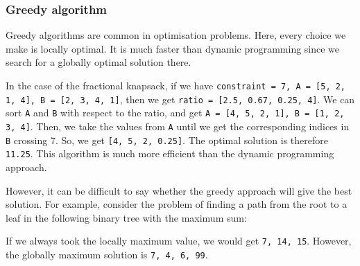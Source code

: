 \documentclass[a4paper, openany]{memoir}
\begin{document}
\subsubsection{Greedy algorithm}
Greedy algorithms are common in optimisation problems. Here, every choice we make is locally optimal. It is much faster than dynamic programming since we search for a globally optimal solution there. 

\noindent In the case of the fractional knapsack, if we have \texttt{constraint = 7, A = [5, 2, 1, 4], B = [2, 3, 4, 1]}, then we get \texttt{ratio = [2.5, 0.67, 0.25, 4]}. We can sort \texttt{A} and \texttt{B} with respect to the ratio, and get \texttt{A = [4, 5, 2, 1], B = [1, 2, 3, 4]}. Then, we take the values from \texttt{A} until we get the corresponding indices in \texttt{B} crossing 7. So, we get \texttt{[4, 5, 2, 0.25]}. The optimal solution is therefore \texttt{11.25}. This algorithm is much more efficient than the dynamic programming approach.

\noindent However, it can be difficult to say whether the greedy approach will give the best solution. For example, consider the problem of finding a path from the root to a leaf in the following binary tree with the maximum sum:
\begin{center}
\end{center}
If we always took the locally maximum value, we would get \texttt{7, 14, 15}. However, the globally maximum solution is \texttt{7, 4, 6, 99}.
\end{document}
